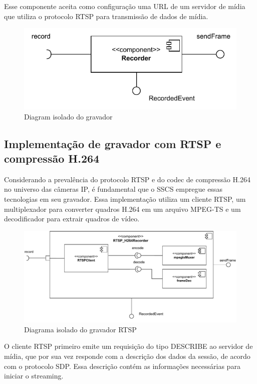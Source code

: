 \documentclass[12pt, %
openright, 
oneside, %
a4paper,    %
brazil]{facom-ufu-abntex2}
\begin{document}
Esse componente aceita como configuração uma URL de um servidor de mídia que
utiliza o protocolo RTSP para transmissão de dados de mídia.

\begin{figure}[!ht]
	\centering
	\includegraphics[width=0.7\linewidth]{gravador.pdf}
	\caption[Diagram isolado do gravador]{Diagram isolado do gravador}
	\label{fig:graficosVariandoTamanhoRede}
\end{figure}

\subsection{Implementação de gravador com RTSP e compressão H.264}

Considerando a prevalência do protocolo RTSP e do codec de compressão H.264 no
universo das câmeras IP, é fundamental que o SSCS empregue essas tecnologias em
seu gravador. Essa implementação utiliza um cliente RTSP, um multiplexador para
converter quadros H.264 em um arquivo MPEG-TS e um decodificador para extrair
quadros de vídeo.

\begin{figure}[!ht]
	\centering
	\includegraphics[width=1\linewidth]{rtsp_h264recorder.pdf}
	\caption[Diagrama isolado do gravador RTSP]{Diagrama isolado do
		gravador RTSP}
	\label{fig:graficosVariandoTamanhoRede}
\end{figure}

O cliente RTSP primeiro emite um requisição do tipo DESCRIBE ao servidor de
mídia, que por sua vez responde com a descrição dos dados da sessão, de acordo
com o protocolo SDP. Essa descrição contém as informações necessárias para
iniciar o streaming.
\end{document}

